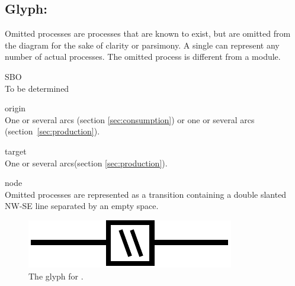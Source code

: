 \subsection{Glyph: }\label{sec:omitted}

Omitted processes are processes that are known to exist, but are omitted from the diagram for the sake of clarity or parsimony. A single  can represent any number of actual processes. The omitted process is different from a module.

\begin{glyphDescription}
 \item[SBO]\mbox{}\\ To be determined
 \item[origin]\mbox{}\\ One or several  arcs (section \ref{sec:consumption}) or one or several  arcs (section~\ref{sec:production}).
 \item[target]\mbox{}\\ One or several  arcs(section \ref{sec:production}).
 \item[node]\mbox{}\\ Omitted processes are represented as a transition containing a double slanted NW-SE line separated by an empty space.
 \end{glyphDescription}

\begin{figure}[H]
  \centering
  \includegraphics[scale = 0.5]{images/omitted}
  \caption{The \PD glyph for .}
  \label{fig:omitted}
\end{figure}



